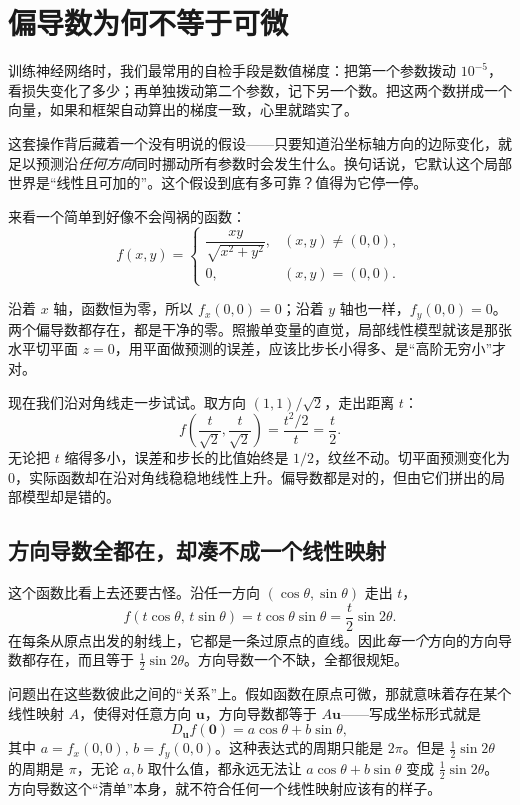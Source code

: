 \section{偏导数为何不等于可微}
\label{sec:02-Calculus/06-Multivariable-Calculus/02}

训练神经网络时，我们最常用的自检手段是数值梯度：把第一个参数拨动 \(10^{-5}\)，看损失变化了多少；再单独拨动第二个参数，记下另一个数。把这两个数拼成一个向量，如果和框架自动算出的梯度一致，心里就踏实了。

这套操作背后藏着一个没有明说的假设——只要知道沿坐标轴方向的边际变化，就足以预测沿\emph{任何方向}同时挪动所有参数时会发生什么。换句话说，它默认这个局部世界是``线性且可加的''。这个假设到底有多可靠？值得为它停一停。

来看一个简单到好像不会闯祸的函数：
\[
f(x,y)=
\begin{cases}
\dfrac{xy}{\sqrt{x^2+y^2}},&(x,y)\ne(0,0),\\[6pt]
0,&(x,y)=(0,0).
\end{cases}
\]

沿着 \(x\) 轴，函数恒为零，所以 \(f_x(0,0)=0\)；沿着 \(y\) 轴也一样，\(f_y(0,0)=0\)。两个偏导数都存在，都是干净的零。照搬单变量的直觉，局部线性模型就该是那张水平切平面 \(z=0\)，用平面做预测的误差，应该比步长小得多、是``高阶无穷小''才对。

现在我们沿对角线走一步试试。取方向 \((1,1)/\sqrt2\)，走出距离 \(t\)：
\[
f\!\left(\frac{t}{\sqrt2},\frac{t}{\sqrt2}\right)
=\frac{t^2/2}{t}
=\frac t2 .
\]
无论把 \(t\) 缩得多小，误差和步长的比值始终是 \(1/2\)，纹丝不动。切平面预测变化为 \(0\)，实际函数却在沿对角线稳稳地线性上升。偏导数都是对的，但由它们拼出的局部模型却是错的。

\subsection{方向导数全都在，却凑不成一个线性映射}

这个函数比看上去还要古怪。沿任一方向 \((\cos\theta,\sin\theta)\) 走出 \(t\)，
\[
f(t\cos\theta,\,t\sin\theta)=t\cos\theta\sin\theta=\frac t2\sin2\theta .
\]
在每条从原点出发的射线上，它都是一条过原点的直线。因此\emph{每一个}方向的方向导数都存在，而且等于 \(\frac12\sin2\theta\)。方向导数一个不缺，全都很规矩。

问题出在这些数彼此之间的``关系''上。假如函数在原点可微，那就意味着存在某个线性映射 \(A\)，使得对任意方向 \(\mathbf u\)，方向导数都等于 \(A\mathbf u\)——写成坐标形式就是
\[
D_{\mathbf u}f(\mathbf 0)=a\cos\theta+b\sin\theta,
\]
其中 \(a=f_x(0,0),\,b=f_y(0,0)\)。这种表达式的周期只能是 \(2\pi\)。但是 \(\frac12\sin2\theta\) 的周期是 \(\pi\)，无论 \(a,b\) 取什么值，都永远无法让 \(a\cos\theta+b\sin\theta\) 变成 \(\frac12\sin2\theta\)。方向导数这个``清单''本身，就不符合任何一个线性映射应该有的样子。

